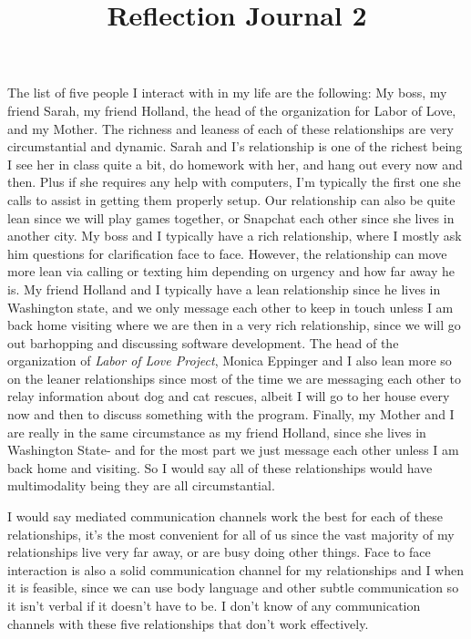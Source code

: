 \documentclass[12pt]{article}
\begin{document}
\title{Reflection Journal 2}
\par
The list of five people I interact with in my life are the following: My boss, my friend Sarah, my friend Holland, the head of the organization for Labor of Love, and my Mother. The richness and leaness of each of these relationships are very circumstantial and dynamic. Sarah and I's relationship is one of the richest being I see her in class quite a bit, do homework with her, and hang out every now and then. Plus if she requires any help with computers, I'm typically the first one she calls to assist in getting them properly setup. Our relationship can also be quite lean since we will play games together, or Snapchat each other since she lives in another city. My boss and I typically have a rich relationship, where I mostly ask him questions for clarification face to face. However, the relationship can move more lean via calling or texting him depending on urgency and how far away he is. My friend Holland and I typically have a lean relationship since he lives in Washington state, and we only message each other to keep in touch unless I am back home visiting where we are then in a very rich relationship, since we will go out barhopping and discussing software development. The head of the organization of \emph{Labor of Love Project}, Monica Eppinger and I also lean more so on the leaner relationships since most of the time we are messaging each other to relay information about dog and cat rescues, albeit I will go to her house every now and then to discuss something with the program. Finally, my Mother and I are really in the same circumstance as my friend Holland, since she lives in Washington State- and for the most part we just message each other unless I am back home and visiting. So I would say all of these relationships would have multimodality being they are all circumstantial.
\par
I would say mediated communication channels work the best for each of these relationships, it's the most convenient for all of us since the vast majority of my relationships live very far away, or are busy doing other things. Face to face interaction is also a solid communication channel for my relationships and I when it is feasible, since we can use body language and other subtle communication so it isn't verbal if it doesn't have to be. I don't know of any communication channels with these five relationships that don't work effectively.
\end{document}
